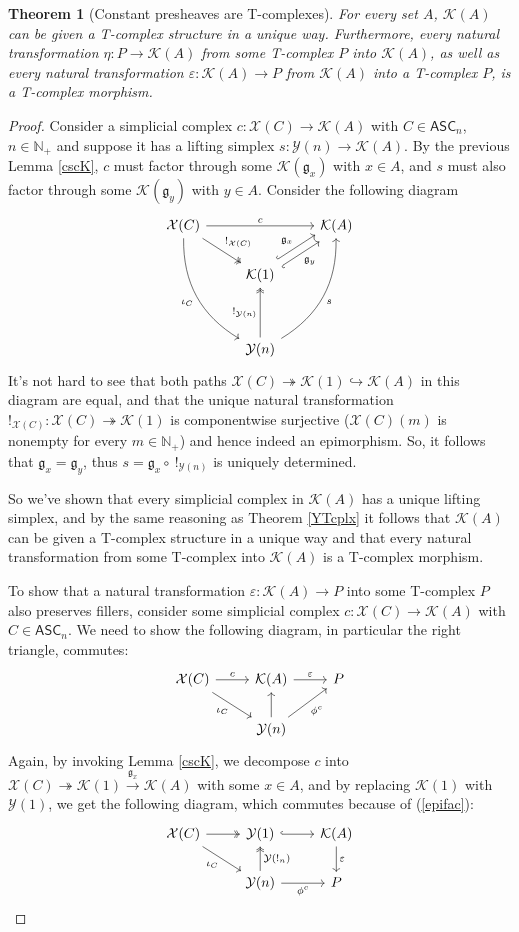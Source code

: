 \documentclass{article}
\newtheorem{theorem}{Theorem}[subsection]
\theoremstyle{remark}
\theoremstyle{definition}
\newcommand{\N}{\mathbb N}
\newcommand{\ASC}{\mathsf{ASC}}
\newcommand{\Y}{\mathcal Y}
\newcommand{\X}{\mathcal X}
\newcommand{\K}{\mathcal K}
\newcommand{\g}{\mathfrak g}
\begin{document}
	\begin{theorem}[Constant presheaves are T-complexes]\label{TcplxK}
		For every set $A$, $\K(A)$ can be given a T-complex structure in a unique way. Furthermore, every natural transformation $\eta:P\to\K(A)$ from some T-complex $P$ into $\K(A)$, as well as every natural transformation $\varepsilon:\K(A)\to P$ from $\K(A)$ into a T-complex $P$, is a T-complex morphism.
	\end{theorem}
	\begin{proof}
		Consider a simplicial complex $c:\X(C)\to\K(A)$ with $C\in\ASC_n$, $n\in\N_+$ and suppose it has a lifting simplex $s:\Y(n)\to\K(A)$. By the previous Lemma \ref{cscK}, $c$ must factor through some $\K(\g_x)$ with $x\in A$, and $s$ must also factor through some $\K(\g_y)$ with $y\in A$. Consider the following diagram
		\[\begin{tikzcd}
			\X(C)\arrow{rr}{c}\arrow[two heads]{dr}{!_{\X(C)}}\arrow[bend right=30]{dddr}[swap]{\iota_C}&&\K(A)\\
			&\K(1)\arrow[hook,shift left=1mm]{ur}{\g_x}\arrow[hook',shift right=1mm]{ur}[swap]{\g_y}\\\\
			&\Y(n)\arrow[two heads]{uu}{!_{\Y(n)}}\arrow[bend right=30]{uuur}[swap]{s}
		\end{tikzcd}\]
		It's not hard to see that both paths $\X(C)\twoheadrightarrow\K(1)\hookrightarrow\K(A)$ in this diagram are equal, and that the unique natural transformation $!_{\X(C)}:\X(C)\twoheadrightarrow\K(1)$ is componentwise surjective ($\X(C)(m)$ is nonempty for every $m\in\N_+$) and hence indeed an epimorphism. So, it follows that $\g_x=\g_y$, thus $s=\g_x\circ\ !_{\Y(n)}$ is uniquely determined.
		
		So we've shown that every simplicial complex in $\K(A)$ has a unique lifting simplex, and by the same reasoning as Theorem \ref{YTcplx} it follows that $\K(A)$ can be given a T-complex structure in a unique way and that every natural transformation from some T-complex into $\K(A)$ is a T-complex morphism.
		
		To show that a natural transformation $\varepsilon:\K(A)\to P$ into some T-complex $P$ also preserves fillers, consider some simplicial complex $c:\X(C)\to\K(A)$ with $C\in\ASC_n$. We need to show the following diagram, in particular the right triangle, commutes:
		\[\begin{tikzcd}
			\X(C)\arrow{r}{c}\arrow{dr}[swap]{\iota_C}&\K(A)\arrow{r}{\varepsilon}&P\\
			&\Y(n)\arrow{u}\arrow{ur}[swap]{\phi^c}
		\end{tikzcd}\]
		Again, by invoking Lemma \ref{cscK}, we decompose $c$ into $\X(C)\twoheadrightarrow\K(1)\xrightarrow{\g_x}\K(A)$ with some $x\in A$, and by replacing $\K(1)$ with $\Y(1)$, we get the following diagram, which commutes because of (\ref{epifac}):
		\[\begin{tikzcd}
			\X(C)\arrow[two heads]{r}\arrow{dr}[swap]{\iota_C}&\Y(1)\arrow[hook]{r}&\K(A)\arrow{d}{\varepsilon}\\
			&\Y(n)\arrow[two heads]{u}[swap]{\Y(!_n)}\arrow{r}[swap]{\phi^c}&P
		\end{tikzcd}\]
	\end{proof}
\end{document}
